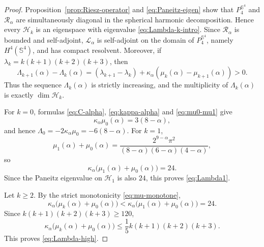 \documentclass[11pt]{article}
\numberwithin{equation}{section}
\begin{document}
\begin{proof}
Proposition~\ref{prop:Riesz-operator} and \eqref{eq:Paneitz-eigen} show that \(P_{4}^{\mathbb S^{4}}\) and \(\mathcal R_{\alpha}\) are simultaneously diagonal in the spherical harmonic decomposition. Hence every \(\mathcal H_{k}\) is an eigenspace with eigenvalue \eqref{eq:Lambda-k-intro}. Since \(\mathcal R_{\alpha}\) is bounded and self-adjoint, \(\mathcal L_{\alpha}\) is self-adjoint on the domain of \(P_{4}^{\mathbb S^{4}}\), namely \(H^{4}(\mathbb S^{4})\), and has compact resolvent. Moreover, if \(\lambda_k=k(k+1)(k+2)(k+3)\), then
\[
\Lambda_{k+1}(\alpha)-\Lambda_k(\alpha)
=(\lambda_{k+1}-\lambda_k)
+\kappa_{\alpha}(\mu_k(\alpha)-\mu_{k+1}(\alpha))>0.
\]
Thus the sequence \(\Lambda_k(\alpha)\) is strictly increasing, and the
multiplicity of \(\Lambda_k(\alpha)\) is exactly \(\dim\mathcal H_k\).

For \(k=0\), formulas \eqref{eq:C-alpha}, \eqref{eq:kappa-alpha} and \eqref{eq:mu0-mu1} give
\[
\kappa_{\alpha}\mu_{0}(\alpha)=3(8-\alpha),
\]
and hence \(\Lambda_{0}=-2\kappa_{\alpha}\mu_{0}=-6(8-\alpha)\).
For \(k=1\),
\[
\mu_{1}(\alpha)+\mu_{0}(\alpha)
=\frac{2^{9-\alpha}\pi^{2}}
{(8-\alpha)(6-\alpha)(4-\alpha)},
\]
so
\[
\kappa_{\alpha}
\bigl(\mu_{1}(\alpha)+\mu_{0}(\alpha)\bigr)=24.
\]
Since the Paneitz eigenvalue on \(\mathcal H_{1}\) is also \(24\), this proves \eqref{eq:Lambda1}.

Let \(k\geq2\). By the strict monotonicity \eqref{eq:mu-monotone},
\[
\kappa_{\alpha}
\bigl(\mu_{k}(\alpha)+\mu_{0}(\alpha)\bigr)
<\kappa_{\alpha}
\bigl(\mu_{1}(\alpha)+\mu_{0}(\alpha)\bigr)=24.
\]
Since \(k(k+1)(k+2)(k+3)\geq120\),
\[
\kappa_{\alpha}
\bigl(\mu_{k}(\alpha)+\mu_{0}(\alpha)\bigr)
\leq\frac15 k(k+1)(k+2)(k+3).
\]
This proves \eqref{eq:Lambda-high}.
\end{proof}
\end{document}
